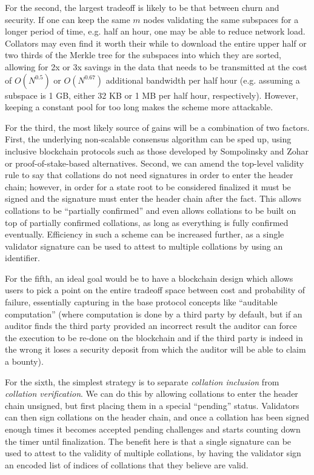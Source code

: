 \documentclass[11pt,a4paper]{article}
\makeatletter
\theoremstyle{plain}
\theoremstyle{definition}
\theoremstyle{remark}
\newcommand{\eg}{e.g.\@\xspace}
\makeatother
\begin{document}
For the second, the largest tradeoff is likely to be that between churn and security. If one can keep the same $m$ nodes validating the same subspaces for a longer period of time, \eg half an hour, one may be able to reduce network load. Collators may even find it worth their while to download the entire upper half or two thirds of the Merkle tree for the subspaces into which they are sorted, allowing for 2x or 3x savings in the data that needs to be transmitted at the cost of $O(N^{0.5})$ or $O(N^{0.67})$ additional bandwidth per half hour (\eg assuming a subspace is 1 GB, either 32 KB or 1 MB per half hour, respectively). However, keeping a constant pool for too long makes the scheme more attackable.

For the third, the most likely source of gains will be a combination of two factors. First, the underlying non-scalable consensus algorithm can be sped up, using inclusive blockchain protocols such as those developed by Sompolinsky and Zohar\cite{inclusive} or proof-of-stake-based alternatives. Second, we can amend the top-level validity rule to say that collations do not need signatures in order to enter the header chain; however, in order for a state root to be considered finalized it must be signed and the signature must enter the header chain after the fact. This allows collations to be ``partially confirmed'' and even allows collations to be built on top of partially confirmed collations, as long as everything is fully confirmed eventually. Efficiency in such a scheme can be increased further, as a single validator signature can be used to attest to multiple collations by using an identifier.

For the fifth, an ideal goal would be to have a blockchain design which allows users to pick a point on the entire tradeoff space between cost and probability of failure, essentially capturing in the base protocol concepts like ``auditable computation'' \cite{auditable} (where computation is done by a third party by default, but if an auditor finds the third party provided an incorrect result the auditor can force the execution to be re-done on the blockchain and if the third party is indeed in the wrong it loses a security deposit from which the auditor will be able to claim a bounty).

For the sixth, the simplest strategy is to separate \emph{collation inclusion} from \emph{collation verification}. We can do this by allowing collations to enter the header chain unsigned, but first placing them in a special ``pending'' status. Validators can then sign collations on the header chain, and once a collation has been signed enough times it becomes accepted pending challenges and starts counting down the timer until finalization. The benefit here is that a single signature can be used to attest to the validity of multiple collations, by having the validator sign an encoded list of indices of collations that they believe are valid.
\end{document}
